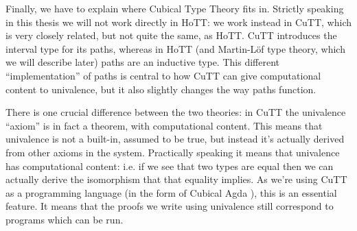 Finally, we have to explain where Cubical Type Theory
\citep{cohenCubicalTypeTheory2016} fits in.
Strictly speaking in this thesis we will not work directly in HoTT: we work
instead in CuTT, which is very closely related, but not quite the same, as HoTT.
CuTT introduces the interval type for its paths, whereas in HoTT (and Martin-Löf
type theory, which we will describe later) paths are an inductive type.
This different ``implementation'' of paths is central to how CuTT can give
computational content to univalence, but it also slightly changes the way paths
function.

There is one crucial difference between the two theories: in CuTT the
univalence ``axiom'' is in fact a theorem, with computational content.
This means that univalence is not a built-in, assumed to be true, but instead
it's actually derived from other axioms in the system.
Practically speaking it means that univalence has computational content: i.e. if
we see that two types are equal then we can actually derive the isomorphism that
that equality implies.
As we're using CuTT as a programming language (in the form of Cubical Agda
\citep{vezzosiCubicalAgdaDependently2019}), this is an essential feature.
It means that the proofs we write using univalence still correspond to programs
which can be run.


